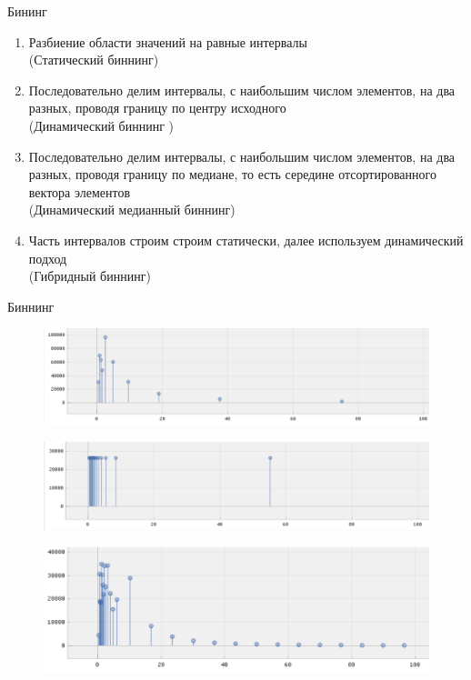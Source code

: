 \documentclass[fullscreen=true,russian,compress,%
	hyperref={unicode,bookmarks=false}]{presentation}
\begin{document}
\begin{frame}{Бининг}
   \begin{enumerate}
      \item Разбиение области значений на равные интервалы \\ (Статический биннинг)
      \item Последовательно делим интервалы, с наибольшим числом элементов, на два разных, проводя границу 
      по центру исходного \\ (Динамический биннинг )
      \item Последовательно делим интервалы, с наибольшим числом элементов, на два разных, проводя границу 
      по медиане, то есть середине отсортированного вектора элементов \\ (Динамический медианный биннинг)
      \item Часть интервалов строим строим статически, далее используем динамический подход \\ (Гибридный биннинг)
   \end{enumerate}
\end{frame}


\begin{frame}{Биннинг}
   \begin{figure}[h!] 
      \centering
      \includegraphics[scale=0.37]{images/rig_dynamic_binning.png}
   \end{figure}
   \begin{figure}[h!]
      \centering
      \includegraphics[scale=0.37]{images/rig_median_binning.png}
   \end{figure}
   \begin{figure}[h!]
      \centering
      \includegraphics[scale=0.46]{images/hybrid_binningpng.png}
   \end{figure}
\end{frame}
\end{document}
